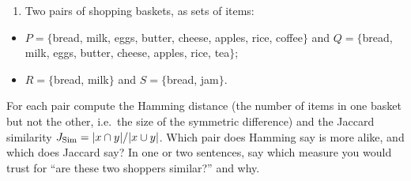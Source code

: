 \documentclass[
  11pt,
]{article}
\providecommand{\tightlist}{%
  \setlength{\itemsep}{0pt}\setlength{\parskip}{0pt}}
\begin{document}
\begin{enumerate}
\def\labelenumi{(\alph{enumi})}
\setcounter{enumi}{2}
\tightlist
\item
  Two pairs of shopping baskets, as sets of items:
\end{enumerate}

\begin{itemize}
\tightlist
\item
  \(P = \{\)bread, milk, eggs, butter, cheese, apples, rice,
  coffee\(\}\) and \(Q = \{\)bread, milk, eggs, butter, cheese, apples,
  rice, tea\(\}\);
\item
  \(R = \{\)bread, milk\(\}\) and \(S = \{\)bread, jam\(\}\).
\end{itemize}

For each pair compute the Hamming distance (the number of items in one
basket but not the other, i.e.~the size of the symmetric difference) and
the Jaccard similarity \(J_{\rm Sim} = |x\cap y|/|x\cup y|\). Which pair
does Hamming say is more alike, and which does Jaccard say? In one or
two sentences, say which measure you would trust for ``are these two
shoppers similar?'' and why.
\end{document}
